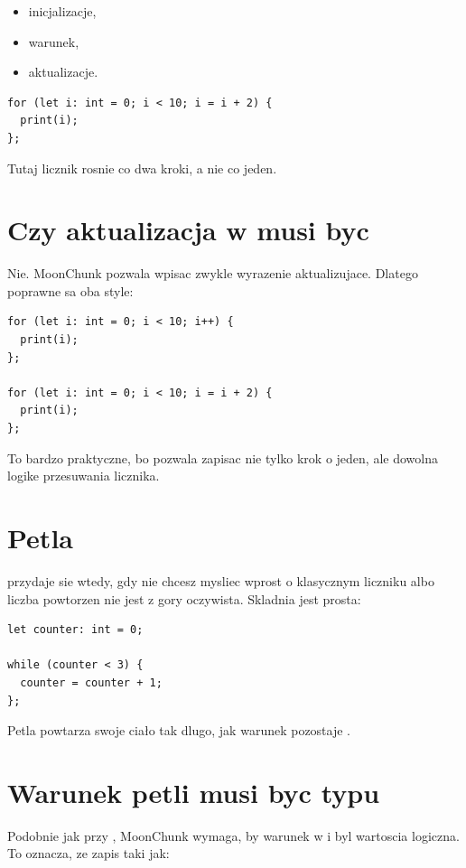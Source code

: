 \begin{itemize}
  \item inicjalizacje,
  \item warunek,
  \item aktualizacje.
\end{itemize}

\begin{lstlisting}[style=moonchunk,caption={Trzy czesci petli for}]
for (let i: int = 0; i < 10; i = i + 2) {
  print(i);
};
\end{lstlisting}

Tutaj licznik rosnie co dwa kroki, a nie co jeden.

\section{Czy aktualizacja w  musi byc }
Nie. MoonChunk pozwala wpisac zwykle wyrazenie aktualizujace. Dlatego poprawne sa oba
style:

\begin{lstlisting}[style=moonchunk,caption={Dwie formy aktualizacji licznika}]
for (let i: int = 0; i < 10; i++) {
  print(i);
};

for (let i: int = 0; i < 10; i = i + 2) {
  print(i);
};
\end{lstlisting}

To bardzo praktyczne, bo pozwala zapisac nie tylko krok o jeden, ale dowolna logike
przesuwania licznika.

\section{Petla }
 przydaje sie wtedy, gdy nie chcesz mysliec wprost o klasycznym liczniku
albo liczba powtorzen nie jest z gory oczywista. Skladnia jest prosta:

\begin{lstlisting}[style=moonchunk,caption={Podstawowa petla while}]
let counter: int = 0;

while (counter < 3) {
  counter = counter + 1;
};
\end{lstlisting}

Petla powtarza swoje ciało tak dlugo, jak warunek pozostaje .

\section{Warunek petli musi byc typu }
Podobnie jak przy , MoonChunk wymaga, by warunek w  i 
byl wartoscia logiczna. To oznacza, ze zapis taki jak:


